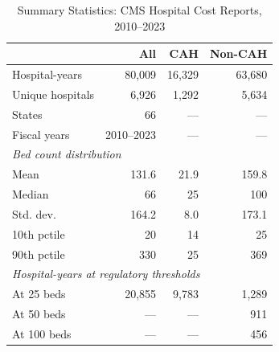 \begin{table}[t]
\centering
\caption{Summary Statistics: CMS Hospital Cost Reports, 2010--2023}
\label{tab:summary}
\begin{tabular}{lrrr}
\hline\hline
 & All & CAH & Non-CAH \\
\hline
Hospital-years & 80,009 & 16,329 & 63,680 \\
Unique hospitals & 6,926 & 1,292 & 5,634 \\
States & 66 & --- & --- \\
Fiscal years & 2010--2023 & --- & --- \\
\hline
\multicolumn{4}{l}{\textit{Bed count distribution}} \\
\quad Mean & 131.6 & 21.9 & 159.8 \\
\quad Median & 66 & 25 & 100 \\
\quad Std. dev. & 164.2 & 8.0 & 173.1 \\
\quad 10th pctile & 20 & 14 & 25 \\
\quad 90th pctile & 330 & 25 & 369 \\
\hline
\multicolumn{4}{l}{\textit{Hospital-years at regulatory thresholds}} \\
\quad At 25 beds & 20,855 & 9,783 & 1,289 \\
\quad At 50 beds & --- & --- & 911 \\
\quad At 100 beds & --- & --- & 456 \\
\hline\hline
\end{tabular}
\par{}
\end{table}

